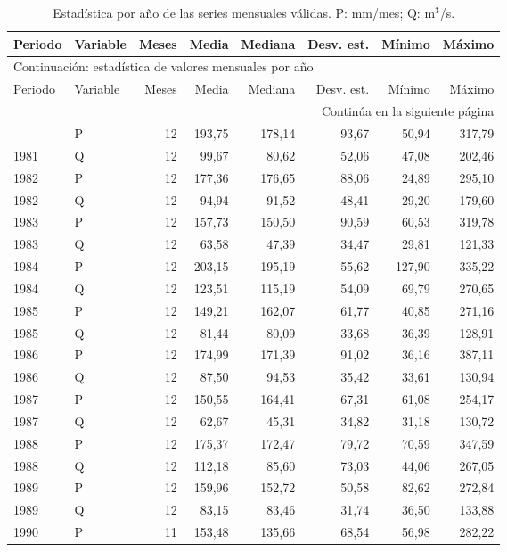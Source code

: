 \begingroup\small
\begin{longtable}{llrrrrrr}
\caption{Estadística por año de las series mensuales válidas. P: mm/mes; Q: m$^3$/s.}\\
\hline
Periodo & Variable & Meses & Media & Mediana & Desv. est. & Mínimo & Máximo \\
\hline\endfirsthead
\multicolumn{8}{l}{Continuación: estadística de valores mensuales por año}\\
\hline
Periodo & Variable & Meses & Media & Mediana & Desv. est. & Mínimo & Máximo \\
\hline\endhead
\hline\multicolumn{8}{r}{Continúa en la siguiente página}\\\endfoot
\hline\endlastfoot
1981 & P & 12 & 193,75 & 178,14 & 93,67 & 50,94 & 317,79 \\
1981 & Q & 12 & 99,67 & 80,62 & 52,06 & 47,08 & 202,46 \\
1982 & P & 12 & 177,36 & 176,65 & 88,06 & 24,89 & 295,10 \\
1982 & Q & 12 & 94,94 & 91,52 & 48,41 & 29,20 & 179,60 \\
1983 & P & 12 & 157,73 & 150,50 & 90,59 & 60,53 & 319,78 \\
1983 & Q & 12 & 63,58 & 47,39 & 34,47 & 29,81 & 121,33 \\
1984 & P & 12 & 203,15 & 195,19 & 55,62 & 127,90 & 335,22 \\
1984 & Q & 12 & 123,51 & 115,19 & 54,09 & 69,79 & 270,65 \\
1985 & P & 12 & 149,21 & 162,07 & 61,77 & 40,85 & 271,16 \\
1985 & Q & 12 & 81,44 & 80,09 & 33,68 & 36,39 & 128,91 \\
1986 & P & 12 & 174,99 & 171,39 & 91,02 & 36,16 & 387,11 \\
1986 & Q & 12 & 87,50 & 94,53 & 35,42 & 33,61 & 130,94 \\
1987 & P & 12 & 150,55 & 164,41 & 67,31 & 61,08 & 254,17 \\
1987 & Q & 12 & 62,67 & 45,31 & 34,82 & 31,18 & 130,72 \\
1988 & P & 12 & 175,37 & 172,47 & 79,72 & 70,59 & 347,59 \\
1988 & Q & 12 & 112,18 & 85,60 & 73,03 & 44,06 & 267,05 \\
1989 & P & 12 & 159,96 & 152,72 & 50,58 & 82,62 & 272,84 \\
1989 & Q & 12 & 83,15 & 83,46 & 31,74 & 36,50 & 133,88 \\
1990 & P & 11 & 153,48 & 135,66 & 68,54 & 56,98 & 282,22 \\

\end{longtable}

